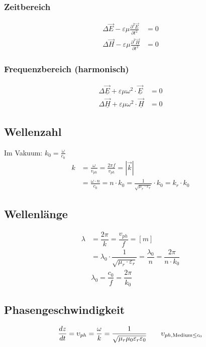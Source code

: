 \subsubsection{Zeitbereich}
\begin{align*}
    \Delta \vec{E}-\varepsilon \mu \frac{\partial^{2} \vec{E}}{\partial t^{2}} & =0 \\
    \Delta \vec{H}-\varepsilon \mu \frac{\partial^{2} \vec{H}}{\partial t^{2}} & =0
\end{align*}

\subsubsection{Frequenzbereich (harmonisch)}
\begin{align*}
    \Delta \underline{\vec{E}}+\varepsilon \mu \omega^{2} \cdot \underline{\vec{E}} & =0 \\
    \Delta \underline{\vec{H}}+\varepsilon \mu \omega^{2} \cdot \underline{\vec{H}} & =0
\end{align*}


\subsection{Wellenzahl}
Im Vakuum: $k_{0}=\frac{\omega}{c_{0}}$
\begin{align*}
    k & = \frac{\omega}{v_{p h}} = \frac{2 \pi f}{v_{p h}} = |\vec{k}|                                                              \\
      & = \frac{\omega \cdot n}{c_{0}} = n \cdot k_{0}=\frac{1}{\sqrt{\mu_{r} \cdot \varepsilon_{r}}} \cdot k_{0}=k_{r} \cdot k_{0}
\end{align*}

\subsection{Wellenlänge}
\begin{align*}
    \lambda & = \dfrac{2 \pi}{k} = \dfrac{v_{ph}}{f} = [m]                                                                      \\
            & = \lambda_0 \cdot \dfrac{1}{\sqrt{\mu_r \cdot \varepsilon_r}} = \dfrac{\lambda_0}{n} = \dfrac{2 \pi}{n \cdot k_0} \\
            & \lambda_0 = \dfrac{c_0}{f} = \dfrac{2\pi}{k_0}
\end{align*}

\subsection{Phasengeschwindigkeit}
\[
    \dfrac{d z}{d t} = \upsilon_{ph} = \dfrac{\omega}{k} = \frac{1}{\sqrt{ \mu_r \mu_0 \varepsilon_r \varepsilon_0}} \qquad \upsilon_{ph,\textnormal{Medium} \leq c_0}
\]

